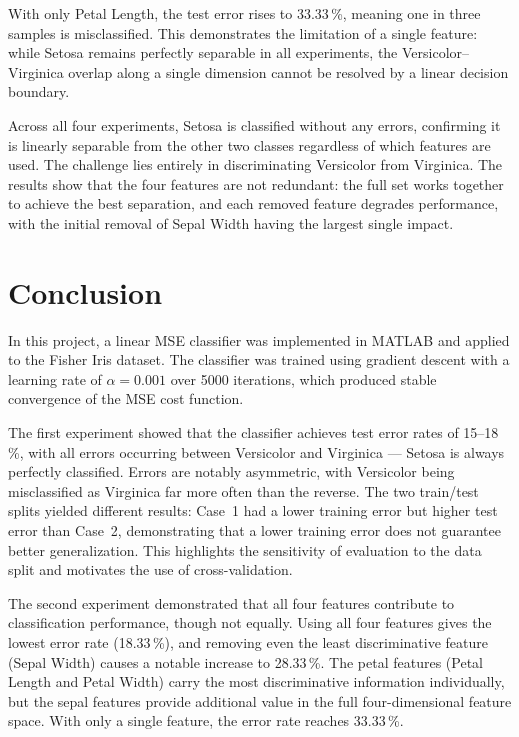 \documentclass[11pt,a4paper]{article}
\begin{document}
With only Petal Length, the test error rises to 33.33\,\%, meaning one in three samples is misclassified. This demonstrates the limitation of a single feature: while Setosa remains perfectly separable in all experiments, the Versicolor--Virginica overlap along a single dimension cannot be resolved by a linear decision boundary.

Across all four experiments, Setosa is classified without any errors, confirming it is linearly separable from the other two classes regardless of which features are used. The challenge lies entirely in discriminating Versicolor from Virginica. The results show that the four features are not redundant: the full set works together to achieve the best separation, and each removed feature degrades performance, with the initial removal of Sepal Width having the largest single impact.

\section{Conclusion}
\label{sec:conclusion}

In this project, a linear MSE classifier was implemented in MATLAB and applied to the Fisher Iris dataset. The classifier was trained using gradient descent with a learning rate of $\alpha = 0.001$ over 5000 iterations, which produced stable convergence of the MSE cost function.

The first experiment showed that the classifier achieves test error rates of 15--18\,\%, with all errors occurring between Versicolor and Virginica --- Setosa is always perfectly classified. Errors are notably asymmetric, with Versicolor being misclassified as Virginica far more often than the reverse. The two train/test splits yielded different results: Case~1 had a lower training error but higher test error than Case~2, demonstrating that a lower training error does not guarantee better generalization. This highlights the sensitivity of evaluation to the data split and motivates the use of cross-validation.

The second experiment demonstrated that all four features contribute to classification performance, though not equally. Using all four features gives the lowest error rate (18.33\,\%), and removing even the least discriminative feature (Sepal Width) causes a notable increase to 28.33\,\%. The petal features (Petal Length and Petal Width) carry the most discriminative information individually, but the sepal features provide additional value in the full four-dimensional feature space. With only a single feature, the error rate reaches 33.33\,\%.
\end{document}
